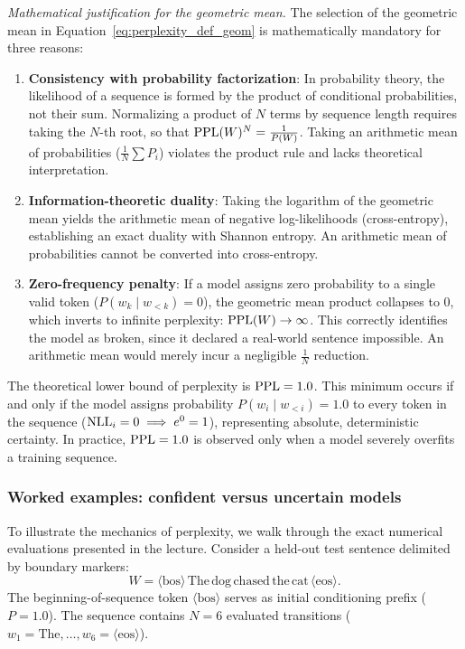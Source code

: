 \documentclass[../../../main.tex]{subfiles}
\begin{document}
\textit{Mathematical justification for the geometric mean.} The selection of the geometric mean in Equation~\eqref{eq:perplexity_def_geom} is mathematically mandatory for three reasons:
\begin{enumerate}
    \item \textbf{Consistency with probability factorization}: In probability theory, the likelihood of a sequence is formed by the product of conditional probabilities, not their sum. Normalizing a product of $N$ terms by sequence length requires taking the $N$-th root, so that $\mathrm{PPL}(W)^N = \frac{1}{P(W)}$. Taking an arithmetic mean of probabilities ($\frac{1}{N}\sum P_i$) violates the product rule and lacks theoretical interpretation.
    \item \textbf{Information-theoretic duality}: Taking the logarithm of the geometric mean yields the arithmetic mean of negative log-likelihoods (cross-entropy), establishing an exact duality with Shannon entropy. An arithmetic mean of probabilities cannot be converted into cross-entropy.
    \item \textbf{Zero-frequency penalty}: If a model assigns zero probability to a single valid token ($P(w_k \mid w_{<k}) = 0$), the geometric mean product collapses to 0, which inverts to infinite perplexity: $\mathrm{PPL}(W) \to \infty$. This correctly identifies the model as broken, since it declared a real-world sentence impossible. An arithmetic mean would merely incur a negligible $\frac{1}{N}$ reduction.
\end{enumerate}

The theoretical lower bound of perplexity is $\mathrm{PPL} = 1.0$. This minimum occurs if and only if the model assigns probability $P(w_i \mid w_{<i}) = 1.0$ to every token in the sequence ($\mathrm{NLL}_i = 0 \implies e^0 = 1$), representing absolute, deterministic certainty. In practice, $\mathrm{PPL} = 1.0$ is observed only when a model severely overfits a training sequence.

\subsubsection{Worked examples: confident versus uncertain models}
To illustrate the mechanics of perplexity, we walk through the exact numerical evaluations presented in the lecture. Consider a held-out test sentence delimited by boundary markers:
\begin{equation*}
W = \langle\text{bos}\rangle \, \text{The} \, \text{dog} \, \text{chased} \, \text{the} \, \text{cat} \, \langle\text{eos}\rangle.
\end{equation*}
The beginning-of-sequence token $\langle\text{bos}\rangle$ serves as initial conditioning prefix ($P=1.0$). The sequence contains $N = 6$ evaluated transitions ($w_1 = \text{The}, \dots, w_6 = \langle\text{eos}\rangle$).
\end{document}
